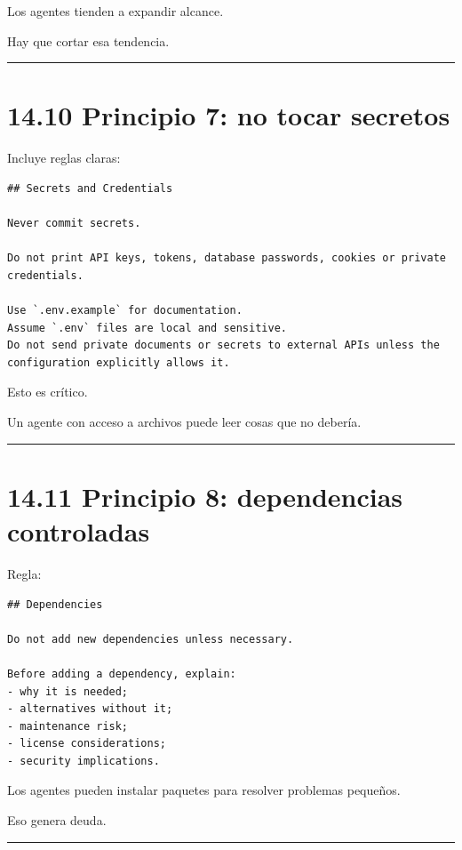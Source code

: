 Los agentes tienden a expandir alcance.

Hay que cortar esa tendencia.

\begin{center}\rule{0.5\linewidth}{0.5pt}\end{center}

\section{14.10 Principio 7: no tocar
secretos}\label{principio-7-no-tocar-secretos}

Incluye reglas claras:

\begin{lstlisting}
## Secrets and Credentials

Never commit secrets.

Do not print API keys, tokens, database passwords, cookies or private credentials.

Use `.env.example` for documentation.
Assume `.env` files are local and sensitive.
Do not send private documents or secrets to external APIs unless the configuration explicitly allows it.
\end{lstlisting}

Esto es crítico.

Un agente con acceso a archivos puede leer cosas que no debería.

\begin{center}\rule{0.5\linewidth}{0.5pt}\end{center}

\section{14.11 Principio 8: dependencias
controladas}\label{principio-8-dependencias-controladas}

Regla:

\begin{lstlisting}
## Dependencies

Do not add new dependencies unless necessary.

Before adding a dependency, explain:
- why it is needed;
- alternatives without it;
- maintenance risk;
- license considerations;
- security implications.
\end{lstlisting}

Los agentes pueden instalar paquetes para resolver problemas pequeños.

Eso genera deuda.

\begin{center}\rule{0.5\linewidth}{0.5pt}\end{center}

